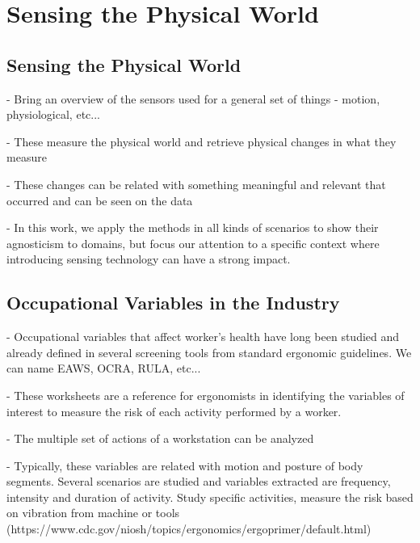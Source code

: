 
%

\chapter{Sensing the Physical World}
\label{cha:theory}

\section{Sensing the Physical World}
\label{sec:sensing_physical}

- Bring an overview of the sensors used for a general set of things - motion, physiological, etc...

- These measure the physical world and retrieve physical changes in what they measure

- These changes can be related with something meaningful and relevant that occurred and can be seen on the data

- In this work, we apply the methods in all kinds of scenarios to show their agnosticism to domains, but focus our attention to a specific context where introducing sensing technology can have a strong impact.



\section{Occupational Variables in the Industry}
\label{subsec:occup_var}


- Occupational variables that affect worker's health have long been studied and already defined in several screening tools from standard ergonomic guidelines. We can name EAWS, OCRA, RULA, etc...

- These worksheets are a reference for ergonomists in identifying the variables of interest to measure the risk of each activity performed by a worker. 

- The multiple set of actions of a workstation can be analyzed

- Typically, these variables are related with motion and posture of body segments. Several scenarios are studied and variables extracted are frequency, intensity and duration of activity. Study specific activities, measure the risk based on vibration from machine or tools (https://www.cdc.gov/niosh/topics/ergonomics/ergoprimer/default.html)


